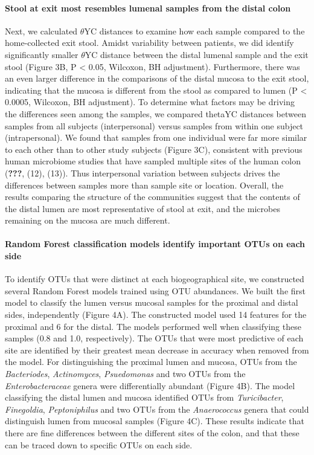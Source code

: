 \documentclass[11pt,]{article}
\let\oldparagraph\paragraph
\renewcommand{\paragraph}[1]{\oldparagraph{#1}\mbox{}}
\begin{document}
\paragraph{Stool at exit most resembles lumenal samples from the distal
colon}\label{stool-at-exit-most-resembles-lumenal-samples-from-the-distal-colon}

Next, we calculated \({\theta}\)YC distances to examine how each sample
compared to the home-collected exit stool. Amidst variability between
patients, we did identify significantly smaller \({\theta}\)YC distance
between the distal lumenal sample and the exit stool (Figure 3B, P
\textless{} 0.05, Wilcoxon, BH adjustment). Furthermore, there was an
even larger difference in the comparisons of the distal mucosa to the
exit stool, indicating that the mucosa is different from the stool as
compared to lumen (P \textless{} 0.0005, Wilcoxon, BH adjustment). To
determine what factors may be driving the differences seen among the
samples, we compared thetaYC distances between samples from all subjects
(interpersonal) versus samples from within one subject (intrapersonal).
We found that samples from one individual were far more similar to each
other than to other study subjects (Figure 3C), consistent with previous
human microbiome studies that have sampled multiple sites of the human
colon (\textbf{???}, (12), (13)). Thus interpersonal variation between
subjects drives the differences between samples more than sample site or
location. Overall, the results comparing the structure of the
communities suggest that the contents of the distal lumen are most
representative of stool at exit, and the microbes remaining on the
mucosa are much different.

\paragraph{Random Forest classification models identify important OTUs
on each
side}\label{random-forest-classification-models-identify-important-otus-on-each-side}

To identify OTUs that were distinct at each biogeographical site, we
constructed several Random Forest models trained using OTU abundances.
We built the first model to classify the lumen versus mucosal samples
for the proximal and distal sides, independently (Figure 4A). The
constructed model used 14 features for the proximal and 6 for the
distal. The models performed well when classifying these samples (0.8
and 1.0, respectively). The OTUs that were most predictive of each site
are identified by their greatest mean decrease in accuracy when removed
from the model. For distinguishing the proximal lumen and mucosa, OTUs
from the \emph{Bacteriodes}, \emph{Actinomyces}, \emph{Psuedomonas} and
two OTUs from the \emph{Enterobacteraceae} genera were differentially
abundant (Figure 4B). The model classifying the distal lumen and mucosa
identified OTUs from \emph{Turicibacter}, \emph{Finegoldia},
\emph{Peptoniphilus} and two OTUs from the \emph{Anaerococcus} genera
that could distinguish lumen from mucosal samples (Figure 4C). These
results indicate that there are fine differences between the different
sites of the colon, and that these can be traced down to specific OTUs
on each side.
\end{document}
